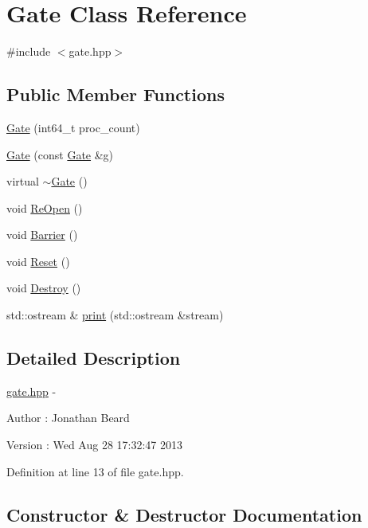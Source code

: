 \hypertarget{class_gate}{}\section{Gate Class Reference}
\label{class_gate}


{\ttfamily \#include $<$gate.\+hpp$>$}

\subsection*{Public Member Functions}
\begin{DoxyCompactItemize}
\item 
\hyperlink{class_gate_af627684ba5ff081322370e0e10e46b98}{Gate} (int64\+\_\+t proc\+\_\+count)
\item 
\hyperlink{class_gate_ab88149aa6cd8284f63cb0a38be1b406f}{Gate} (const \hyperlink{class_gate}{Gate} \&g)
\item 
virtual \hyperlink{class_gate_a1cce7f16a7c36254b75b0633fb6823ac}{$\sim$\+Gate} ()
\item 
void \hyperlink{class_gate_ac1fa1904a541351a562e4d0951a0e4c2}{Re\+Open} ()
\item 
void \hyperlink{class_gate_a39d25cf4111e160bd552aa71b808fc2d}{Barrier} ()
\item 
void \hyperlink{class_gate_ad1735aaacf5032b1cc89bf42f7aea9f5}{Reset} ()
\item 
void \hyperlink{class_gate_a760a4286d19c8999a3b28157f89d1c4b}{Destroy} ()
\item 
std\+::ostream \& \hyperlink{class_gate_a3306a9171e6adaa6907973ef8fe274de}{print} (std\+::ostream \&stream)
\end{DoxyCompactItemize}


\subsection{Detailed Description}
\hyperlink{gate_8hpp_source}{gate.\+hpp} -\/ \begin{DoxyAuthor}{Author}
\+: Jonathan Beard 
\end{DoxyAuthor}
\begin{DoxyVersion}{Version}
\+: Wed Aug 28 17\+:32\+:47 2013 
\end{DoxyVersion}


Definition at line 13 of file gate.\+hpp.



\subsection{Constructor \& Destructor Documentation}
\hypertarget{class_gate_af627684ba5ff081322370e0e10e46b98}{}\label{class_gate_af627684ba5ff081322370e0e10e46b98} 
